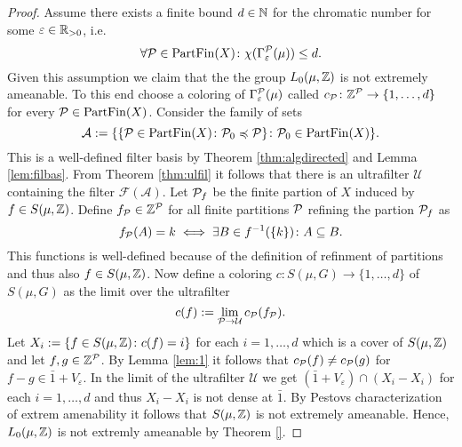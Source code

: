 \begin{proof}
  Assume there exists a finite bound $d \in \N$ for the chromatic number for some $\varepsilon \in \R_{>0}$, i.e.
  \begin{equation*}
    \forall \P \in {\rm PartFin}(X)\colon \chi(\Gamma_\varepsilon^{\P}(\mu)) \leq d. 
  \end{equation*}
  Given this assumption we claim that the the group $L_0(\mu, \Z)$ is not extremely ameanable. To this end choose a coloring of $\Gamma_{\varepsilon}^{\P}(\mu)$ called $c_{\P}\colon \Z^{\P} \to \{1, \ldots, d\}$ for every $\P \in {\rm PartFin}(X)$. Consider the family of sets
  \begin{equation*}
    \mathcal{A} := \{\{ \P \in {\rm PartFin}(X)\colon \P_0 \preccurlyeq \P\}\colon \P_0 \in {\rm PartFin}(X)\}.
  \end{equation*} 
  This is a well-defined filter basis by Theorem \ref{thm:algdirected} and Lemma \ref{lem:filbas}. From Theorem \ref{thm:ulfil} it follows that there is an ultrafilter $\mathcal{U}$ containing the filter $\mathcal{F}(\mathcal{A})$.
 Let $\P_f$ be the finite partion of $X$ induced by $f \in S(\mu, \Z)$. Define $f_\P \in \Z^\P$ for all finite partitions $\P$ refining the partion $\P_f$ as
  \begin{equation*}
    f_\P(A) = k \iff \exists B \in f^{-1}(\{k\})\colon A \subseteq B. 
  \end{equation*}
  This functions is well-defined because of the definition of refinment of partitions and thus also $f \in S(\mu, \Z)$.
  Now define a coloring $c: S(\mu, G) \to \{1, \ldots, d\}$ of $S(\mu, G)$ as the limit over the ultrafilter
  \begin{equation*}
    c(f) := \lim\limits_{\P \to \mathcal{U}} c_{\P}(f_\P).
  \end{equation*}
  Let $X_i := \{f \in S(\mu, \Z)\colon c(f) = i\}$ for each $i = 1, \ldots, d$ which is a cover of $S(\mu, \Z)$ and let $f, g \in \Z^\P$. By Lemma \ref{lem:1} it follows that $c_\P(f) \neq c_\P(g)$ for $f - g \in \bar{1} + V_\varepsilon$.
  In the limit of the ultrafilter $\mathcal{U}$ we get $(\bar{1} + V_\varepsilon) \cap (X_i - X_i)$ for each $i = 1, \ldots, d$ and thus $X_i - X_i$ is not dense at $\bar{1}$. By Pestovs characterization \cite[Theorem 3.4.9]{PestovDyn} of extrem amenability it follows that $S(\mu, \Z)$ is not extremely ameanable. Hence, $L_0(\mu, \Z)$ is not extremly ameanable by Theorem \ref{}. 


\end{proof}
